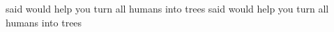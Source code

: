 \documentclass[char]{guildcamp2}
\begin{document}
\begin{contacts}
  \contact{\cTreeFae{}} \cTreeFae{\They} said \cTreeFae{\they} would help you turn all humans into trees
  \contact{\cTroll{}} \cTroll{\They} said \cTroll{\they} would help you turn all humans into trees
\end{contacts}


\end{document}
